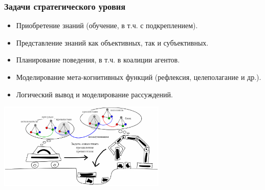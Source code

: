 \documentclass[12pt]{beamer}
\begin{document}
\begin{frame}
\frametitle{Задачи стратегического уровня}
\begin{itemize}
	\item Приобретение знаний (обучение, в т.ч. с подкреплением).
	\item Представление знаний как объективных, так и субъективных.
	\item Планирование поведения, в т.ч. в коалиции агентов.
	\item Моделирование мета-когнитивных функций (рефлексия, целеполагание и др.).
	\item Логический вывод и моделирование рассуждений.
\end{itemize}
\par\bigskip
\begin{center}
	\includegraphics[width=0.6\textwidth]{robotic_signs}
	
\end{center}
\end{frame}
\end{document}

